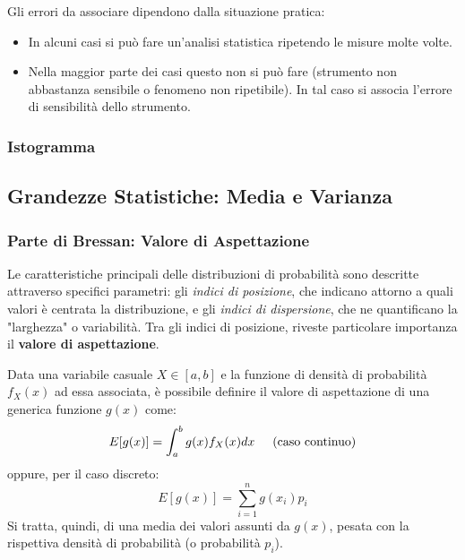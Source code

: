 \documentclass{article}
\theoremstyle{remark}
\newcommand{\ripasso}[1]{
    \subsubsection{\texorpdfstring{\color{red}Parte di Bressan: #1}{Parte di Bressan: #1}}
}
\begin{document}
Gli errori da associare dipendono dalla situazione pratica:
\begin{itemize}
    \item In alcuni casi si può fare un'analisi statistica ripetendo le misure molte volte.
    \item Nella maggior parte dei casi  questo non si può fare (strumento non abbastanza sensibile o fenomeno non ripetibile). In tal caso si associa l'errore di sensibilità dello strumento.
\end{itemize}

\subsubsection{Istogramma}

\begin{center}
\end{center}


\subsection{Grandezze Statistiche: Media e Varianza}


\ripasso{Valore di Aspettazione}

Le caratteristiche principali delle distribuzioni di probabilità sono descritte attraverso specifici parametri: gli \textit{indici di posizione}, che indicano attorno a quali valori è centrata la distribuzione, e gli \textit{indici di dispersione}, che ne quantificano la "larghezza" o variabilità.
Tra gli indici di posizione, riveste particolare importanza il \textbf{valore di aspettazione}.

Data una variabile casuale $X \in [a,b]$ e la funzione di densità di probabilità $f_X(x)$ ad essa associata, è possibile definire il valore di aspettazione di una generica funzione $g(x)$ come:
\[
E[g(x)]= \int_{a}^{b} g(x) f_X(x) dx \hspace{0.5cm} (\text{caso continuo})
\]
oppure, per il caso discreto:
\[
E[g(x)]=  \sum_{i=1}^{n} g(x_i) p_i
\]
Si tratta, quindi, di una media dei valori assunti da $g(x)$, pesata con la rispettiva densità di probabilità (o probabilità $p_i$).
\end{document}
